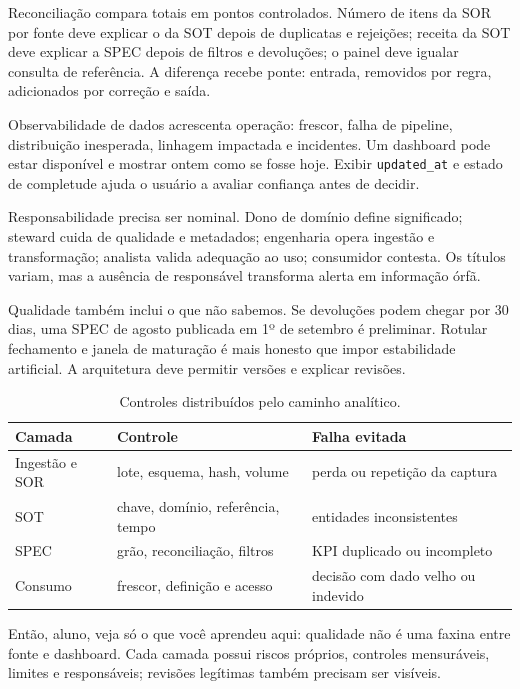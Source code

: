 Reconciliação compara totais em pontos controlados. Número de itens da SOR por fonte deve explicar o da SOT depois de duplicatas e rejeições; receita da SOT deve explicar a SPEC depois de filtros e devoluções; o painel deve igualar consulta de referência. A diferença recebe ponte: entrada, removidos por regra, adicionados por correção e saída.

Observabilidade de dados acrescenta operação: frescor, falha de pipeline, distribuição inesperada, linhagem impactada e incidentes. Um dashboard pode estar disponível e mostrar ontem como se fosse hoje. Exibir \texttt{updated\_at} e estado de completude ajuda o usuário a avaliar confiança antes de decidir.

Responsabilidade precisa ser nominal. Dono de domínio define significado; steward cuida de qualidade e metadados; engenharia opera ingestão e transformação; analista valida adequação ao uso; consumidor contesta. Os títulos variam, mas a ausência de responsável transforma alerta em informação órfã.

Qualidade também inclui o que não sabemos. Se devoluções podem chegar por 30 dias, uma SPEC de agosto publicada em 1º de setembro é preliminar. Rotular fechamento e janela de maturação é mais honesto que impor estabilidade artificial. A arquitetura deve permitir versões e explicar revisões.

\begin{table}[htbp]
\centering
\small
\caption{Controles distribuídos pelo caminho analítico.}
\label{tab:qualidade-camada}
\begin{tabularx}{0.95\textwidth}{@{}p{2.5cm}p{3.0cm}Y@{}}
\toprule
\textbf{Camada} & \textbf{Controle} & \textbf{Falha evitada} \\
\midrule
Ingestão e SOR & lote, esquema, hash, volume & perda ou repetição da captura \\
SOT & chave, domínio, referência, tempo & entidades inconsistentes \\
SPEC & grão, reconciliação, filtros & KPI duplicado ou incompleto \\
Consumo & frescor, definição e acesso & decisão com dado velho ou indevido \\
\bottomrule
\end{tabularx}
\end{table}

\begin{SummaryBox}
Então, aluno, veja só o que você aprendeu aqui: qualidade não é uma faxina entre fonte e dashboard. Cada camada possui riscos próprios, controles mensuráveis, limites e responsáveis; revisões legítimas também precisam ser visíveis.
\end{SummaryBox}


